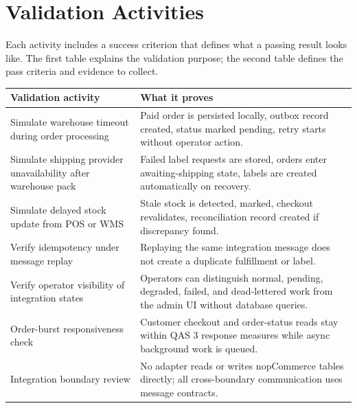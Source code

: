 \section{Validation Activities}

Each activity includes a success criterion that defines what a passing result looks like. The
first table explains the validation purpose; the second table defines the pass criteria and
evidence to collect.

\begingroup
\small
\setlength{\tabcolsep}{4pt}
\renewcommand{\arraystretch}{1.15}
\begin{center}
\begin{tabular}{|p{}|p{}|}
\hline
\textbf{Validation activity} & \textbf{What it proves} \\
\hline
Simulate warehouse timeout during order processing &
Paid order is persisted locally, outbox record created, status marked pending, retry starts without operator action. \\
\hline
Simulate shipping provider unavailability after warehouse pack &
Failed label requests are stored, orders enter awaiting-shipping state, labels are created automatically on recovery. \\
\hline
Simulate delayed stock update from POS or WMS &
Stale stock is detected, marked, checkout revalidates, reconciliation record created if discrepancy found. \\
\hline
Verify idempotency under message replay &
Replaying the same integration message does not create a duplicate fulfillment or label. \\
\hline
Verify operator visibility of integration states &
Operators can distinguish normal, pending, degraded, failed, and dead-lettered work from the admin UI without database queries. \\
\hline
Order-burst responsiveness check &
Customer checkout and order-status reads stay within QAS 3 response measures while async background work is queued. \\
\hline
Integration boundary review &
No adapter reads or writes nopCommerce tables directly; all cross-boundary communication uses message contracts. \\
\hline
\end{tabular}
\end{center}
\endgroup

